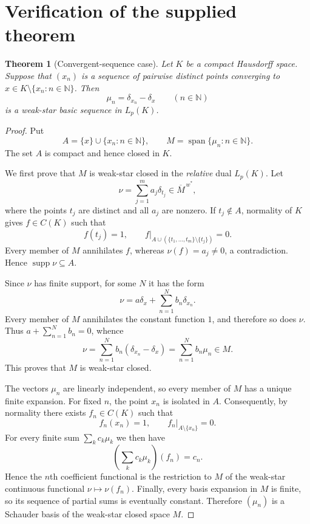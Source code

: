 \documentclass[11pt]{article}
\newtheorem{theorem}{Theorem}[section]
\newcommand{\Lp}{L_p}
\newcommand{\wstar}{w^*}
\newcommand{\supp}{\operatorname{supp}}
\newcommand{\spann}{\operatorname{span}}
\newcommand{\N}{\mathbb{N}}
\begin{document}
\section{Verification of the supplied theorem}\label{sec:verification}

\begin{theorem}[Convergent-sequence case]\label{thm:sequence}
Let $K$ be a compact Hausdorff space.  Suppose that $(x_n)$ is a sequence of
pairwise distinct points converging to
$x\in K\setminus\{x_n:n\in\N\}$.  Then
\[
 \mu_n=\delta_{x_n}-\delta_x\qquad(n\in\N)
\]
is a weak-star basic sequence in $\Lp(K)$.
\end{theorem}

\begin{proof}
Put
\[
 A=\{x\}\cup\{x_n:n\in\N\},\qquad
 M=\spann\{\mu_n:n\in\N\}.
\]
The set $A$ is compact and hence closed in $K$.

We first prove that $M$ is weak-star closed in the \emph{relative} dual
$\Lp(K)$.  Let
\[
 \nu=\sum_{j=1}^m a_j\delta_{t_j}\in\overline M^{\,\wstar},
\]
where the points $t_j$ are distinct and all $a_j$ are nonzero.  If
$t_j\notin A$, normality of $K$ gives $f\in C(K)$ such that
\[
 f(t_j)=1,\qquad
 f\big|_{A\cup(\{t_1,\ldots,t_m\}\setminus\{t_j\})}=0.
\]
Every member of $M$ annihilates $f$, whereas $\nu(f)=a_j\neq0$, a
contradiction.  Hence $\supp\nu\subseteq A$.

Since $\nu$ has finite support, for some $N$ it has the form
\[
 \nu=a\delta_x+\sum_{n=1}^N b_n\delta_{x_n}.
\]
Every member of $M$ annihilates the constant function $1$, and therefore so
does $\nu$.  Thus $a+\sum_{n=1}^N b_n=0$, whence
\[
 \nu=\sum_{n=1}^N b_n(\delta_{x_n}-\delta_x)
     =\sum_{n=1}^N b_n\mu_n\in M.
\]
This proves that $M$ is weak-star closed.

The vectors $\mu_n$ are linearly independent, so every member of $M$ has a
unique finite expansion.  For fixed $n$, the point $x_n$ is isolated in $A$.
Consequently, by normality there exists $f_n\in C(K)$ such that
\[
 f_n(x_n)=1,\qquad f_n\big|_{A\setminus\{x_n\}}=0.
\]
For every finite sum $\sum_k c_k\mu_k$ we then have
\[
 \left(\sum_k c_k\mu_k\right)(f_n)=c_n.
\]
Hence the $n$th coefficient functional is the restriction to $M$ of the
weak-star continuous functional $\nu\mapsto\nu(f_n)$.  Finally, every basis
expansion in $M$ is finite, so its sequence of partial sums is eventually
constant.  Therefore $(\mu_n)$ is a Schauder basis of the weak-star closed
space $M$.
\end{proof}
\end{document}

